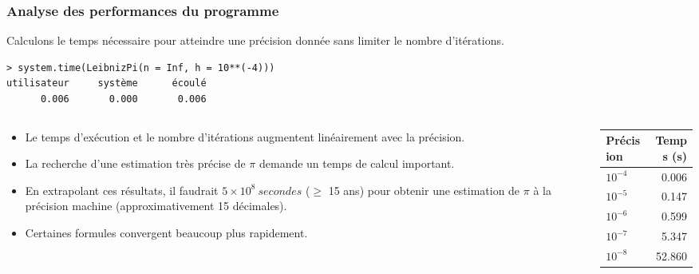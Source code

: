 \documentclass[10pt]{beamer}
\begin{document}
\begin{frame}[fragile]
  \frametitle{Analyse des performances du programme}
  Calculons le temps nécessaire pour atteindre une précision donnée sans limiter le nombre d'itérations.
  \begin{lstlisting}
> system.time(LeibnizPi(n = Inf, h = 10**(-4)))
utilisateur     système      écoulé
      0.006       0.000       0.006
    \end{lstlisting}


\begin{columns}[t]
\begin{column}{0.7\textwidth}
  \begin{itemize}
  \item Le temps d’exécution et le nombre d'itérations augmentent linéairement avec la précision.
  \item La recherche d’une estimation très précise de $\pi$ demande un temps de calcul important.

  \item En extrapolant ces résultats, il faudrait  $5 \times 10^8\ secondes$ ($\geq$ 15 ans) pour obtenir une estimation de $\pi$ à la précision machine (approximativement 15 décimales).
  \item<alert@1> Certaines formules convergent beaucoup plus rapidement.
  \end{itemize}
\end{column}
\begin{column}{0.3\textwidth}
  \begin{table}[h]
    \centering
    \begin{tabular}{lr}
      \toprule
      Précision & Temps (s) \\
      \midrule
      $10^{-4}$ & 0.006     \\
      $10^{-5}$ & 0.147     \\
      $10^{-6}$ & 0.599     \\
      $10^{-7}$ & 5.347     \\
      $10^{-8}$ & 52.860    \\
      \bottomrule
    \end{tabular}
  \end{table}
\end{column}
\end{columns}
\end{frame}
\end{document}
